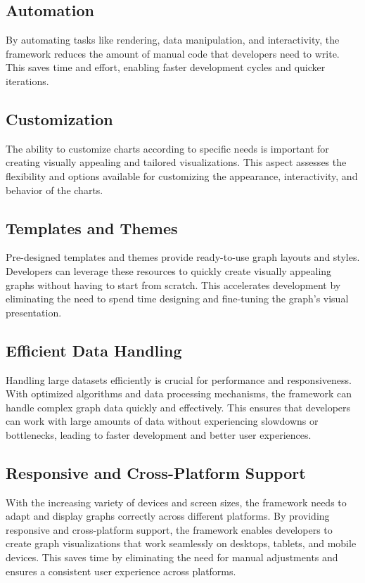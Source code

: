 \documentclass[a4paper, 11pt]{article}
\begin{document}
    \subsection{Automation}
    By automating tasks like rendering, data manipulation, and interactivity, the framework reduces the amount of manual code that developers need to write. This saves time and effort, enabling faster development cycles and quicker iterations.
    \subsection{Customization}
    The ability to customize charts according to specific needs is important for creating visually appealing and tailored visualizations. This aspect assesses the flexibility and options available for customizing the appearance, interactivity, and behavior of the charts.
    \subsection{Templates and Themes}
    Pre-designed templates and themes provide ready-to-use graph layouts and styles. Developers can leverage these resources to quickly create visually appealing graphs without having to start from scratch. This accelerates development by eliminating the need to spend time designing and fine-tuning the graph's visual presentation.
    \subsection{Efficient Data Handling}
    Handling large datasets efficiently is crucial for performance and responsiveness. With optimized algorithms and data processing mechanisms, the framework can handle complex graph data quickly and effectively. This ensures that developers can work with large amounts of data without experiencing slowdowns or bottlenecks, leading to faster development and better user experiences.
    \subsection{Responsive and Cross-Platform Support}
    With the increasing variety of devices and screen sizes, the framework needs to adapt and display graphs correctly across different platforms. By providing responsive and cross-platform support, the framework enables developers to create graph visualizations that work seamlessly on desktops, tablets, and mobile devices. This saves time by eliminating the need for manual adjustments and ensures a consistent user experience across platforms.
\end{document}
